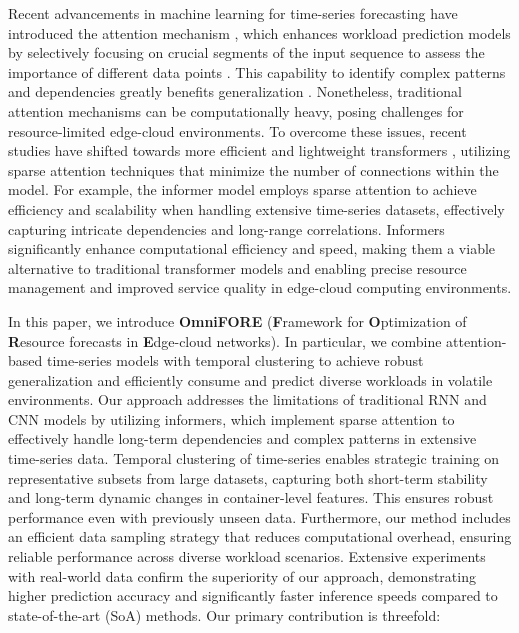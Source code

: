 Recent advancements in machine learning for time-series forecasting have introduced the attention mechanism \cite{vaswani2017attention}, which enhances workload prediction models by selectively focusing on crucial segments of the input sequence to assess the importance of different data points \cite{gort2023forecasting}. This capability to identify complex patterns and dependencies greatly benefits generalization \cite{9889720}. Nonetheless, traditional attention mechanisms can be computationally heavy, posing challenges for resource-limited edge-cloud environments. To overcome these issues, recent studies have shifted towards more efficient and lightweight transformers \cite{fasterandlightertransformers}, utilizing sparse attention techniques \cite{gorbett2023sparse, STRec, ma2024multivariate} that minimize the number of connections within the model. For example, the informer model \cite{zhou2021informer} employs sparse attention to achieve efficiency and scalability when handling extensive time-series datasets, effectively capturing intricate dependencies and long-range correlations. Informers significantly enhance computational efficiency and speed, making them a viable alternative to traditional transformer models and enabling precise resource management and improved service quality in edge-cloud computing environments.

In this paper, we introduce \textbf{OmniFORE} (\textbf{F}ramework for \textbf{O}ptimization of \textbf{R}esource forecasts in \textbf{E}dge-cloud networks). In particular, we combine attention-based time-series models with temporal clustering to achieve robust generalization and efficiently consume and predict diverse workloads in volatile environments. Our approach addresses the limitations of traditional RNN and CNN models by utilizing informers, which implement sparse attention to effectively handle long-term dependencies and complex patterns in extensive time-series data. Temporal clustering of time-series enables strategic training on representative subsets from large datasets, capturing both short-term stability and long-term dynamic changes in container-level features. This ensures robust performance even with previously unseen data. Furthermore, our method includes an efficient data sampling strategy that reduces computational overhead, ensuring reliable performance across diverse workload scenarios. Extensive experiments with real-world data confirm the superiority of our approach, demonstrating higher prediction accuracy and significantly faster inference speeds compared to state-of-the-art (SoA) methods. Our primary contribution is threefold:

